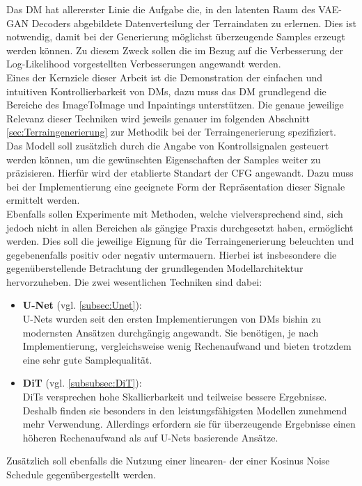 Das \ac{DM} hat allererster Linie die Aufgabe die, in den latenten Raum des VAE-GAN Decoders abgebildete Datenverteilung der Terraindaten zu erlernen.  Dies ist notwendig, damit bei der Generierung möglichst überzeugende Samples erzeugt werden können. Zu diesem Zweck sollen die im Bezug auf die Verbesserung der Log-Likelihood vorgestellten Verbesserungen angewandt werden. \\
Eines der Kernziele dieser Arbeit ist die Demonstration der einfachen und intuitiven Kontrollierbarkeit von \ac{DM}s, dazu muss das \ac{DM} grundlegend die Bereiche des ImageToImage und Inpaintings unterstützen. Die genaue jeweilige Relevanz dieser Techniken wird jeweils genauer im folgenden Abschnitt \ref{sec:Terraingenerierung} zur Methodik bei der Terraingenerierung spezifiziert. \\
Das Modell soll zusätzlich durch die Angabe von Kontrollsignalen gesteuert werden können, um die gewünschten Eigenschaften der Samples weiter zu präzisieren. Hierfür wird der etablierte Standart der \ac{CFG} angewandt. Dazu muss bei der Implementierung eine geeignete Form der Repräsentation dieser Signale ermittelt werden. \\
Ebenfalls sollen Experimente mit Methoden, welche vielversprechend sind, sich jedoch nicht in allen Bereichen als gängige Praxis durchgesetzt haben, ermöglicht werden. Dies soll die jeweilige Eignung für die Terraingenerierung beleuchten und gegebenenfalls positiv oder negativ untermauern. Hierbei ist insbesondere die gegenüberstellende Betrachtung der grundlegenden Modellarchitektur hervorzuheben. Die zwei wesentlichen Techniken sind dabei:  
\begin{itemize}
    \item \textbf{U-Net} (vgl. \ref{subsec:Unet}): \\
    U-Nets wurden seit den ersten Implementierungen von \ac{DM}s bishin zu modernsten Ansätzen durchgängig angewandt. Sie benötigen, je nach Implementierung, vergleichsweise wenig Rechenaufwand und bieten trotzdem eine sehr gute Samplequalität. 
    \item \textbf{DiT} (vgl. \ref{subsubsec:DiT}): \\
    \ac{DiT}s versprechen hohe Skallierbarkeit und teilweise bessere Ergebnisse. Deshalb finden sie besonders in den leistungsfähigsten Modellen zunehmend mehr Verwendung. Allerdings erfordern sie für überzeugende Ergebnisse einen höheren Rechenaufwand als auf U-Nets basierende Ansätze. 
\end{itemize}
Zusätzlich soll ebenfalls die Nutzung einer linearen- der einer Kosinus Noise Schedule gegenübergestellt werden. 


